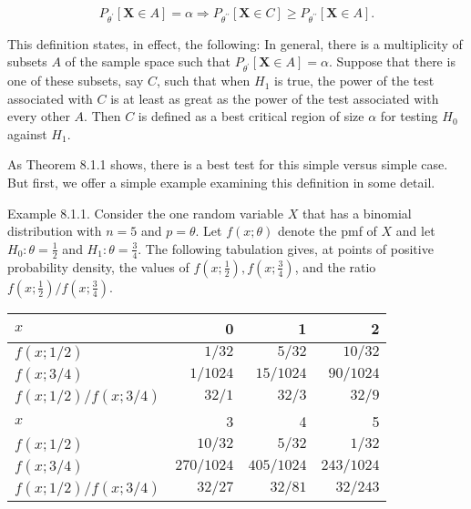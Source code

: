 $$
P_{\theta^{\prime}}[\mathbf{X} \in A]=\alpha \Rightarrow P_{\theta^{\prime \prime}}[\mathbf{X} \in C] \geq P_{\theta^{\prime \prime}}[\mathbf{X} \in A] .
$$

This definition states, in effect, the following: In general, there is a multiplicity of subsets $A$ of the sample space such that $P_{\theta^{\prime}}[\mathbf{X} \in A]=\alpha$. Suppose that there is one of these subsets, say $C$, such that when $H_{1}$ is true, the power of the test associated with $C$ is at least as great as the power of the test associated with every other $A$. Then $C$ is defined as a best critical region of size $\alpha$ for testing $H_{0}$ against $H_{1}$.

As Theorem 8.1.1 shows, there is a best test for this simple versus simple case. But first, we offer a simple example examining this definition in some detail.

Example 8.1.1. Consider the one random variable $X$ that has a binomial distribution with $n=5$ and $p=\theta$. Let $f(x ; \theta)$ denote the pmf of $X$ and let $H_{0}: \theta=\frac{1}{2}$ and $H_{1}: \theta=\frac{3}{4}$. The following tabulation gives, at points of positive probability density, the values of $f\left(x ; \frac{1}{2}\right), f\left(x ; \frac{3}{4}\right)$, and the ratio $f\left(x ; \frac{1}{2}\right) / f\left(x ; \frac{3}{4}\right)$.

\begin{center}
\begin{tabular}{|l|r|r|r|}
\hline
$x$ & 0 & 1 & 2 \\
\hline
$f(x ; 1 / 2)$ & $1 / 32$ & $5 / 32$ & $10 / 32$ \\
\hline
$f(x ; 3 / 4)$ & $1 / 1024$ & $15 / 1024$ & $90 / 1024$ \\
\hline
$f(x ; 1 / 2) / f(x ; 3 / 4)$ & $32 / 1$ & $32 / 3$ & $32 / 9$ \\
\hline\hline
$x$ & 3 & 4 & 5 \\
\hline
$f(x ; 1 / 2)$ & $10 / 32$ & $5 / 32$ & $1 / 32$ \\
\hline
$f(x ; 3 / 4)$ & $270 / 1024$ & $405 / 1024$ & $243 / 1024$ \\
\hline
$f(x ; 1 / 2) / f(x ; 3 / 4)$ & $32 / 27$ & $32 / 81$ & $32 / 243$ \\
\hline
\end{tabular}
\end{center}

